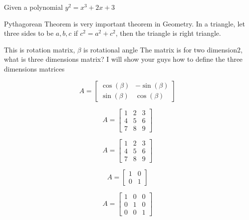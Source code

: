 \begin{example}
Given a polynomial $y^2 = x^3 + 2x + 3$
\end{example} 


\begin{theorem}
Pythagorean Theorem is very important theorem in Geometry.
In a triangle, let three sides to be $a, b, c$ 
if $c^2 = a^2 + c^2$, then the triangle is right triangle.
\end{theorem} 

This is rotation matrix, $\beta$ is rotational angle
The matrix is for two dimension2, what is three dimensions matrix?
I will show your guys how to define the three dimensions matrices

\[ 
    A= \begin{bmatrix}
    \cos(\beta) & -\sin(\beta)\\
    \sin(\beta) & \cos(\beta)
    \end{bmatrix} 
\]


\[ 
    A= \begin{bmatrix}
    1 & 2 & 3\\
    4 & 5 & 6\\
    7 & 8 & 9
    \end{bmatrix} 
\]

\[ A= \begin{bmatrix}
1 & 2 & 3\\
4 & 5 & 6\\
7 & 8 & 9
\end{bmatrix} 
 \]

\[ A= \begin{bmatrix}
1 & 0\\
0 & 1
\end{bmatrix} 
 \]

\[ 
    A= \begin{bmatrix}
    1 & 0 & 0\\
    0 & 1 & 0\\
    0 & 0 & 1
    \end{bmatrix} 
 \]



